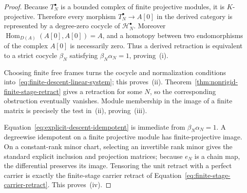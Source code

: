 \documentclass[11pt]{article}
\theoremstyle{definition}
\begin{document}
\begin{proof}
Because $T_N^\bullet$ is a bounded complex of finite projective modules, it is
$K$-projective.  Therefore every morphism
$T_N^\bullet\to A[0]$ in the derived category is represented by a degree-zero
cocycle of $\mathcal H_N^\bullet$.  Moreover
$\operatorname{Hom}_{D(A)}(A[0],A[0])=A$, and a homotopy between two
endomorphisms of the complex $A[0]$ is necessarily zero.  Thus a derived
retraction is equivalent to a strict cocycle $\beta_N$ satisfying
$\beta_N\alpha_N=1$, proving~(i).

Choosing finite free frames turns the cocycle and normalization conditions
into~\eqref{eq:finite-descent-linear-system}; this proves~(ii).
Theorem~\ref{thm:nonrigid-finite-stage-retract} gives a retraction for some
$N$, so the corresponding obstruction eventually vanishes.  Module
membership in the image of a finite matrix is precisely the test in~(ii),
proving~(iii).

Equation~\eqref{eq:explicit-descent-idempotent} is immediate from
$\beta_N\alpha_N=1$.  A degreewise idempotent on a finite projective module
has finite-projective image.  On a constant-rank minor chart, selecting an
invertible rank minor gives the standard explicit inclusion and projection
matrices; because $e_N$ is a chain map, the differential preserves its image.
Tensoring the unit retract with a perfect carrier is exactly the finite-stage
carrier retract of Equation~\eqref{eq:finite-stage-carrier-retract}.  This
proves~(iv).
\end{proof}
\end{document}
